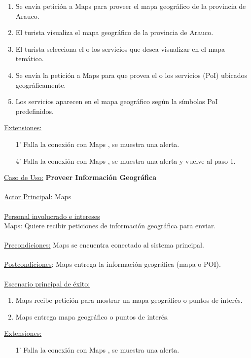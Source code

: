 \documentclass[12pt]{article}
\begin{document}
\begin{enumerate}
\item Se envía petición a Maps para proveer el mapa geográfico de la provincia de Arauco.
\item El turista visualiza el mapa geográfico de la provincia de Arauco.
\item El turista selecciona el o los servicios que desea visualizar en el mapa temático.
\item Se envía la petición a Maps para que provea el o los servicios (PoI) ubicados geográficamente.
\item Los servicios aparecen en el mapa geográfico según la símbolos PoI predefinidos.
\end{enumerate}
\underline{Extensiones:}
\begin{enumerate}
\item [1’] Falla la conexión con Maps , se muestra una alerta.
\item [4’] Falla la conexión con Maps , se muestra una alerta  y vuelve al paso 1.
\end{enumerate}
\underline{Caso de Uso:} \textbf{Proveer Información Geográfica} \\\\\underline{Actor Principal}: Maps\\\\\underline{Personal involucrado e intereses}\\Maps: Quiere recibir peticiones de información geográfica para enviar.\\\\\underline{Precondiciones:} Maps se encuentra conectado al sistema principal.\\\\\underline{Postcondiciones}: Maps entrega la información geográfica (mapa o POI).\\\\\underline{Escenario principal de éxito:}
\begin{enumerate}
\item Maps recibe petición para mostrar un mapa geográfico o puntos de interés.
\item Maps entrega mapa geográfico o puntos de interés.
\end{enumerate}
\underline{Extensiones:}
\begin{itemize}
\item[1'] Falla la conexión con Maps , se muestra una alerta.
\end{itemize}
\end{document}

